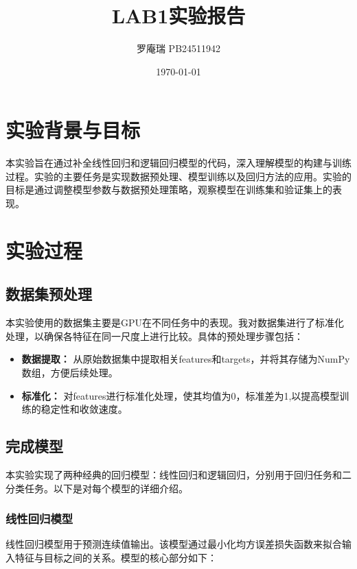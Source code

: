 \documentclass[12pt]{article}
\title{LAB1实验报告}
\author{罗庵瑞 PB24511942}
\date{\today}
\begin{document}
\maketitle

\section{实验背景与目标}


本实验旨在通过补全线性回归和逻辑回归模型的代码，深入理解模型的构建与训练过程。实验的主要任务是实现数据预处理、模型训练以及回归方法的应用。实验的目标是通过调整模型参数与数据预处理策略，观察模型在训练集和验证集上的表现。

\section{实验过程}

\subsection{数据集预处理}
本实验使用的数据集主要是GPU在不同任务中的表现。我对数据集进行了标准化处理，以确保各特征在同一尺度上进行比较。具体的预处理步骤包括：
\begin{itemize}
    \item \textbf{数据提取：} 从原始数据集中提取相关features和targets，并将其存储为NumPy数组，方便后续处理。
    \item \textbf{标准化：} 对features进行标准化处理，使其均值为0，标准差为1,以提高模型训练的稳定性和收敛速度。
\end{itemize}

\subsection{完成模型}

本实验实现了两种经典的回归模型：线性回归和逻辑回归，分别用于回归任务和二分类任务。以下是对每个模型的详细介绍。

\subsubsection{线性回归模型}

线性回归模型用于预测连续值输出。该模型通过最小化均方误差损失函数来拟合输入特征与目标之间的关系。模型的核心部分如下：
\end{document}
